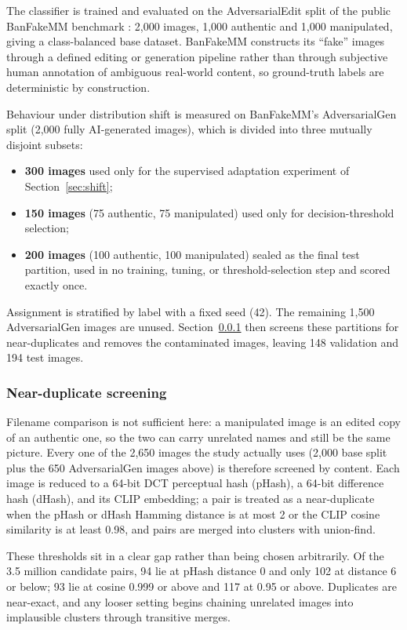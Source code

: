 \documentclass[conference,a4paper]{IEEEtran}
\begin{document}
The classifier is trained and evaluated on the AdversarialEdit split of the
public BanFakeMM benchmark \cite{banfakemm}: 2{,}000 images, 1{,}000 authentic
and 1{,}000 manipulated, giving a class-balanced base dataset. BanFakeMM
constructs its ``fake'' images through a defined editing or generation
pipeline rather than through subjective human annotation of ambiguous
real-world content, so ground-truth labels are deterministic by construction.

Behaviour under distribution shift is measured on BanFakeMM's AdversarialGen
split (2{,}000 fully AI-generated images), which is divided into three
mutually disjoint subsets:

\begin{itemize}
\item \textbf{300 images} used only for the supervised adaptation experiment
of Section~\ref{sec:shift};
\item \textbf{150 images} (75 authentic, 75 manipulated) used only for
decision-threshold selection;
\item \textbf{200 images} (100 authentic, 100 manipulated) sealed as the final
test partition, used in no training, tuning, or threshold-selection step and
scored exactly once.
\end{itemize}

Assignment is stratified by label with a fixed seed (42). The remaining
1{,}500 AdversarialGen images are unused. Section~\ref{sec:dedup} then screens
these partitions for near-duplicates and removes the contaminated images,
leaving 148 validation and 194 test images.

\subsubsection{Near-duplicate screening}
\label{sec:dedup}
Filename comparison is not sufficient here: a manipulated image is an edited
copy of an authentic one, so the two can carry unrelated names and still be
the same picture. Every one of the 2{,}650 images the study actually uses
(2{,}000 base split plus the 650 AdversarialGen images above) is therefore
screened by content. Each image is reduced to a 64-bit DCT perceptual hash
(pHash), a 64-bit difference hash (dHash), and its CLIP embedding; a pair is
treated as a near-duplicate when the pHash or dHash Hamming distance is at
most 2 or the CLIP cosine similarity is at least 0.98, and pairs are merged
into clusters with union-find.

These thresholds sit in a clear gap rather than being chosen arbitrarily. Of
the 3.5 million candidate pairs, 94 lie at pHash distance 0 and only 102 at
distance 6 or below; 93 lie at cosine 0.999 or above and 117 at 0.95 or above.
Duplicates are near-exact, and any looser setting begins chaining unrelated
images into implausible clusters through transitive merges.
\end{document}
